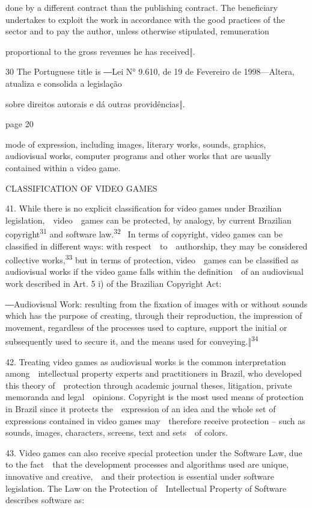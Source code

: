 \documentclass[
]{article}
\begin{document}
{done by a different contract than the publishing contract. The
beneficiary undertakes to exploit the work in accordance with the good
practices of the sector and to pay the author, unless otherwise
stipulated, remuneration}

{proportional to the gross revenues he has received}{‖}{.}

{30 }{The Portuguese title is ―}{Lei N° 9.610, de 19 de Fevereiro de
1998}{---}{Altera, atualiza e consolida a legislação}

{sobre direitos autorais e dá outras providências‖.}

{page 20}

{mode of expression, including images, literary works, sounds, graphics,
audiovisual works, computer programs and other works that are usually
contained within a video game.}

{CLASSIFICATION OF VIDEO GAMES}

{41. }{While there is no explicit classification for video games under
Brazilian legislation,~~video~~games can be protected, by analogy, by
current Brazilian copyright}\textsuperscript{{31 }}{and software
law.}\textsuperscript{{32 }}{~In terms of copyright, video games can be
classified in different ways: with respect~~to~~authorship, they may be
considered collective works,}\textsuperscript{{33 }}{but in terms of
protection, video~~games can be classified as audiovisual works if the
video game falls within the definition~~of an audiovisual work described
in Art. 5 i) of the Brazilian Copyright Act:}

{―Audiovisual Work: resulting }{from the fixation of images with or
without sounds which has the purpose of creating, through their
reproduction, the impression of movement, regardless of the processes
used to capture, support the initial or subsequently used to secure it,
and the means }{used for conveying.‖}\textsuperscript{{34}}

{42. }{Treating video games as audiovisual works is the common
interpretation among~~intellectual property experts and practitioners in
Brazil, who developed this theory of~~protection through academic
journal theses, litigation, private memoranda and legal~~opinions.
Copyright is the most used means of protection in Brazil since it
protects the~~expression of an idea and the whole set of expressions
contained in video games may~~therefore receive protection }{-- }{such
as sounds, images, characters, screens, text and sets~~of colors.}

{43. }{Video games can also receive special protection under the
}{Software Law}{, due to the fact~~that the development processes and
algorithms used are unique, innovative and creative,~~and their
protection is essential under software legislation. The }{Law on the
Protection of~~Intellectual Property of Software }{describes software
as:}
\end{document}
